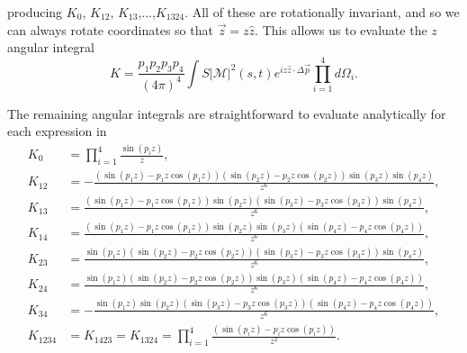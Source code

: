 producing $K_0$, $K_{12}$, $K_{13}$,...,$K_{1324}$.  All of these are rotationally invariant, and so we can always rotate coordinates so that $\vec z=z\hat z$.  This allows us to evaluate the $z$ angular integral
\begin{equation}
K=\frac{p_1p_2p_3p_4}{(4\pi)^4}\int S|\mathcal{M}|^2(s,t)e^{iz \hat z\cdot\Delta\vec p}\prod_{i=1}^4d\Omega_i.
\end{equation}

The remaining angular integrals are straightforward to evaluate analytically for each expression in 
\begin{align}
K_0&=\prod_{i=1}^4\frac{\sin(p_iz)}{z},\\
K_{12}&=-\frac{(\sin(p_1z)-p_1z\cos(p_1z))(\sin(p_2z)-p_2z\cos(p_2z))\sin(p_3z)\sin(p_4z)}{z^6},\\
K_{13}&=\frac{(\sin(p_1z)-p_1z\cos(p_1z))\sin(p_2z)(\sin(p_3z)-p_3z\cos(p_3z))\sin(p_4z)}{z^6},\\
K_{14}&=\frac{(\sin(p_1z)-p_1z\cos(p_1z))\sin(p_2z)\sin(p_3z)(\sin(p_4z)-p_4z\cos(p_4z))}{z^6},\\
K_{23}&=\frac{\sin(p_1z)(\sin(p_2z)-p_2z\cos(p_2z))(\sin(p_3z)-p_3z\cos(p_3z))\sin(p_4z)}{z^6},\\
K_{24}&=\frac{\sin(p_1z)(\sin(p_2z)-p_2z\cos(p_2z))\sin(p_3z)(\sin(p_4z)-p_4z\cos(p_4z))}{z^6},\\
K_{34}&=-\frac{\sin(p_1z)\sin(p_2z)(\sin(p_3z)-p_3z\cos(p_3z))(\sin(p_4z)-p_4z\cos(p_4z))}{z^6},\\
K_{1234}&=K_{1423}=K_{1324}=\prod_{i=1}^4\frac{(\sin(p_iz)-p_iz\cos(p_iz))}{z^2}.
\end{align}

